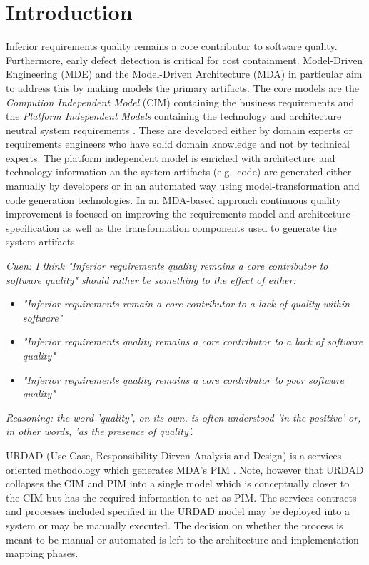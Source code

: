 \section{Introduction}\label{sec:Introduction}

Inferior requirements quality remains a core contributor to software quality\cite{heck_experiences_2008,_strategies_2011}. Furthermore, early defect detection is critical for cost containment\cite{betterRefernceThanBoehm1981WhichReliesOnWaterfall}. Model-Driven Engineering (MDE) and the Model-Driven Architecture (MDA) \cite{frankel_model_2003} in particular aim to address this by making models the primary artifacts. The core models are the \emph{Compution Independent Model} (CIM) containing the business requirements and the \emph{Platform Independent Models} containing the technology and architecture neutral system requirements \cite{needAGoodCitation}. These are developed either by domain experts or requirements engineers who have solid domain knowledge and not by technical experts. The platform independent model is enriched with architecture and technology information an the system artifacts (e.g.\ code) are generated either manually by developers or in an automated way using model-transformation and code generation technologies. In an MDA-based approach continuous quality improvement is focused on improving the requirements model and architecture specification as well as the transformation components used to generate the system artifacts.

\emph{Cuen: I think "Inferior requirements quality remains a core contributor to software quality" should rather be something to the effect of either:}

\begin{itemize}
  \item \emph{"Inferior requirements remain a core contributor to a lack of quality within software"}
  \item \emph{"Inferior requirements quality remains a core contributor to a lack of software quality"}
  \item \emph{"Inferior requirements quality remains a core contributor to poor software quality"}
\end{itemize}
\emph{Reasoning: the word 'quality', on its own, is often understood 'in the positive' or, in other words, 'as the presence of quality'.}

URDAD (Use-Case, Responsibility Dirven Analysis and Design) \cite{solms_technology_2007} is a services oriented methodology which generates MDA's PIM \cite{solms_generating_2009}. Note, however that URDAD collapses the CIM and PIM into a single model which is conceptually closer to the CIM but has the required information to act as PIM. The services contracts and processes included specified in the URDAD model may be deployed into a system or may be manually executed. The decision on whether the process is meant to be manual or automated is left to the architecture and implementation mapping phases. 

